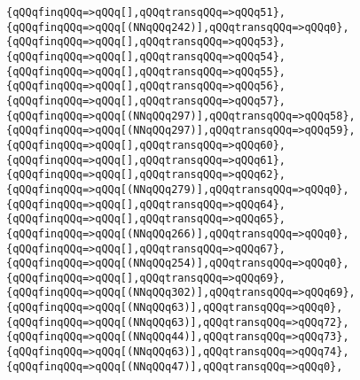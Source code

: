 \verb|{qQQqfinqQQq=>qQQq[],qQQqtransqQQq=>qQQq51},|\newline
\verb|{qQQqfinqQQq=>qQQq[(NNqQQq242)],qQQqtransqQQq=>qQQq0},|\newline
\verb|{qQQqfinqQQq=>qQQq[],qQQqtransqQQq=>qQQq53},|\newline
\verb|{qQQqfinqQQq=>qQQq[],qQQqtransqQQq=>qQQq54},|\newline
\verb|{qQQqfinqQQq=>qQQq[],qQQqtransqQQq=>qQQq55},|\newline
\verb|{qQQqfinqQQq=>qQQq[],qQQqtransqQQq=>qQQq56},|\newline
\verb|{qQQqfinqQQq=>qQQq[],qQQqtransqQQq=>qQQq57},|\newline
\verb|{qQQqfinqQQq=>qQQq[(NNqQQq297)],qQQqtransqQQq=>qQQq58},|\newline
\verb|{qQQqfinqQQq=>qQQq[(NNqQQq297)],qQQqtransqQQq=>qQQq59},|\newline
\verb|{qQQqfinqQQq=>qQQq[],qQQqtransqQQq=>qQQq60},|\newline
\verb|{qQQqfinqQQq=>qQQq[],qQQqtransqQQq=>qQQq61},|\newline
\verb|{qQQqfinqQQq=>qQQq[],qQQqtransqQQq=>qQQq62},|\newline
\verb|{qQQqfinqQQq=>qQQq[(NNqQQq279)],qQQqtransqQQq=>qQQq0},|\newline
\verb|{qQQqfinqQQq=>qQQq[],qQQqtransqQQq=>qQQq64},|\newline
\verb|{qQQqfinqQQq=>qQQq[],qQQqtransqQQq=>qQQq65},|\newline
\verb|{qQQqfinqQQq=>qQQq[(NNqQQq266)],qQQqtransqQQq=>qQQq0},|\newline
\verb|{qQQqfinqQQq=>qQQq[],qQQqtransqQQq=>qQQq67},|\newline
\verb|{qQQqfinqQQq=>qQQq[(NNqQQq254)],qQQqtransqQQq=>qQQq0},|\newline
\verb|{qQQqfinqQQq=>qQQq[],qQQqtransqQQq=>qQQq69},|\newline
\verb|{qQQqfinqQQq=>qQQq[(NNqQQq302)],qQQqtransqQQq=>qQQq69},|\newline
\verb|{qQQqfinqQQq=>qQQq[(NNqQQq63)],qQQqtransqQQq=>qQQq0},|\newline
\verb|{qQQqfinqQQq=>qQQq[(NNqQQq63)],qQQqtransqQQq=>qQQq72},|\newline
\verb|{qQQqfinqQQq=>qQQq[(NNqQQq44)],qQQqtransqQQq=>qQQq73},|\newline
\verb|{qQQqfinqQQq=>qQQq[(NNqQQq63)],qQQqtransqQQq=>qQQq74},|\newline
\verb|{qQQqfinqQQq=>qQQq[(NNqQQq47)],qQQqtransqQQq=>qQQq0},|\newline
